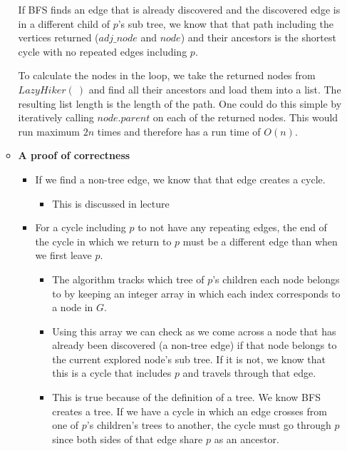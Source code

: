 \documentclass[letterpaper,11pt]{article}
\begin{document}
\begin{enumerate}
\begin{itemize}
\begin{algorithm}[H]
        \end{algorithm}
        \color{teal}

        If BFS finds an edge that is already discovered and the discovered edge
        is in a different child of $p $'s sub tree, we know that that path 
        including the vertices returned ($adj\_node$ and $node$) and their 
        ancestors is the shortest cycle with no repeated edges including $p$.

        To calculate the nodes in the loop, we take the returned nodes from
        $LazyHiker\left( \  \right) $ and find all their ancestors and load them
        into a list. The resulting list length is the length of the path.
        One could do this simple by iteratively calling $node.parent$ on each 
        of the returned nodes. This would run maximum $2n$ times and therefore
        has a run time of $O\left( n \right) $.

    \item \textbf{A proof of correctness}
        \begin{itemize}
            \item If we find a non-tree edge, we know that that edge creates a
                cycle.
                \begin{itemize}
                    \item This is discussed in lecture
                \end{itemize}
            \item For a cycle including $p$ to not have any repeating edges, the end
                of the cycle in which we return to $p$ must be a different edge
                than when we first leave $p$.

                \begin{itemize}
                    \item The algorithm tracks which tree of $p$'s children 
                        each node belongs to by keeping an integer array in
                        which each index corresponds to a node in $G$.
                    \item Using this array we can check as we come across a
                        node that has already been discovered (a non-tree
                        edge) if that node belongs to the current explored 
                        node's sub tree. If it is not, we know that this is a
                        cycle that includes $p$ and travels through that edge.
                    \item This is true because of the definition of a tree. We 
                        know BFS creates a tree. If we have a cycle in which an
                        edge crosses from one of $ p$'s children's trees to 
                        another, the cycle must go through $p$ since both sides
                        of that edge share $p$ as an ancestor.
                \end{itemize}


\end{itemize}
\end{itemize}
\end{enumerate}
\end{document}
